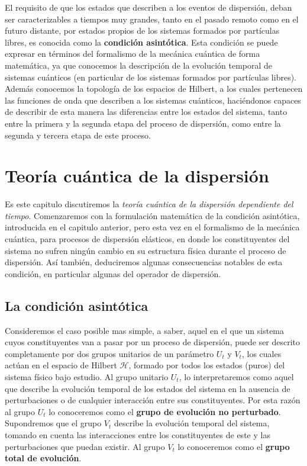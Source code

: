 \documentclass[12pt]{book}
\numberwithin{equation}{chapter}
\def\H{\mathcal{H}}
\begin{document}
El requisito de que los estados que describen a los eventos de dispersi\'on, deban ser caracterizables a tiempos muy grandes, tanto en el pasado remoto como en el futuro distante, por estados propios de los sistemas formados por part\'iculas libres, es conocida como la {\bf condici\'on asint\'otica}. Esta condici\'on se puede expresar en t\'erminos del formalismo de la mec\'anica cu\'antica de forma matem\'atica, ya que conocemos la descripci\'on de la evoluci\'on temporal de sistemas cu\'anticos (en particular de los sistemas formados por part\'iculas libres). Adem\'as conocemos la topolog\'ia de los espacios de Hilbert, a los cuales pertenecen las funciones de onda que describen a los sistemas cu\'anticos, haci\'endonos capaces de describir de esta manera las diferencias entre los estados del sistema, tanto entre la primera y la segunda etapa del proceso de dispersi\'on, como entre la segunda y tercera etapa de este proceso.


\newpage

\chapter{Teor\'ia cu\'antica de la dispersi\'on}

Es este capitulo discutiremos la \emph{teor\'ia cu\'antica de la dispersi\'on dependiente del tiempo}. Comenzaremos con la formulaci\'on matem\'atica de la condici\'on asint\'otica, introducida en el capitulo anterior, pero esta vez en el formalismo de la mec\'anica cu\'antica, para procesos de dispersi\'on el\'asticos, en donde los constituyentes del sistema no sufren ning\'un cambio en su estructura f\'isica durante el proceso de dispersi\'on. As\'i tambi\'en, deduciremos algunas consecuencias notables de esta condici\'on, en particular algunas del operador de dispersi\'on. 

\section{La condici\'on asint\'otica}
Consideremos el caso posible mas simple, a saber, aquel en el que un sistema cuyos constituyentes van a pasar por un proceso de dispersi\'on, puede ser descrito completamente por dos grupos unitarios de un par\'ametro $U_{t}$ y $V_{t}$, los cuales act\'uan en el espacio de Hilbert $\H$, formado por todos los estados (puros) del sistema f\'isico bajo estudio. Al grupo unitario $U_{t}$, lo interpretaremos como aquel que describe la evoluci\'on temporal de los estados del sistema en la ausencia de perturbaciones o de cualquier interacci\'on entre sus constituyentes. Por esta raz\'on al grupo $U_{t}$ lo conoceremos como el {\bf grupo de evoluci\'on no perturbado}. Supondremos que el grupo $V_{t}$ describe la evoluci\'on temporal del sistema, tomando en cuenta las interacciones entre los constituyentes de este y las perturbaciones que puedan existir. Al grupo $V_{t}$ lo conoceremos como el {\bf grupo total de evoluci\'on}.\\
\end{document}
